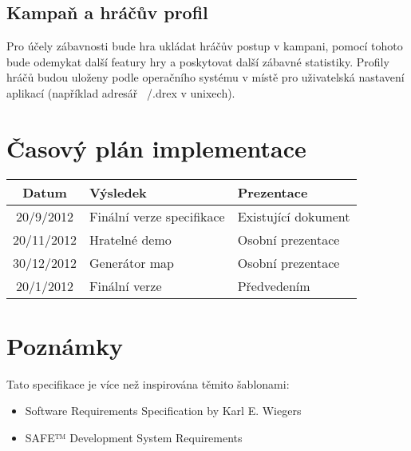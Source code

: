 \documentclass{article}
\begin{document}
\subsection{Kampaň a hráčův profil}

Pro účely zábavnosti bude hra ukládat hráčův postup v kampani, pomocí tohoto bude odemykat další featury hry a poskytovat další zábavné statistiky. Profily hráčů budou uloženy podle operačního systému v místě pro uživatelská nastavení aplikací (například adresář ~/.drex v unixech).

\section{Časový plán implementace}

\begin{center}
\begin{tabular}{|c|l|l|}
\hline
Datum & Výsledek & Prezentace \\
\hline
\hline
20/9/2012 & Finální verze specifikace & Existující dokument \\
\hline
20/11/2012 & Hratelné demo & Osobní prezentace \\
\hline
30/12/2012 & Generátor map & Osobní prezentace \\
\hline
20/1/2012 & Finální verze & Předvedením \\
\hline
\end{tabular}
\end{center}

\section{Poznámky}

Tato specifikace je více než inspirována těmito šablonami:
\begin{itemize}
\item Software Requirements Specification by Karl E. Wiegers
\item SAFE™ Development System Requirements
\end{itemize}
\end{document}
